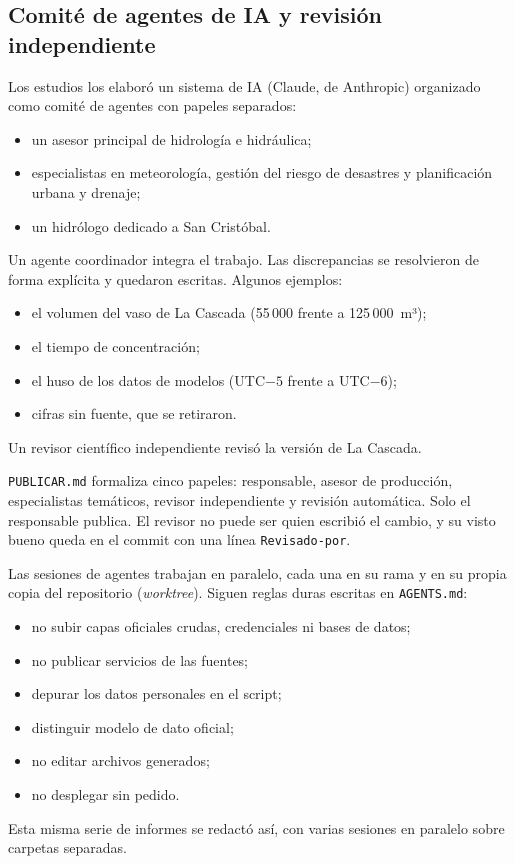 \documentclass{sosg-informe}
\begin{document}
\subsection{Comité de agentes de IA y revisión independiente}
Los estudios los elaboró un sistema de IA (Claude, de Anthropic) organizado como comité de agentes con papeles separados:
\begin{itemize}
  \item un asesor principal de hidrología e hidráulica;
  \item especialistas en meteorología, gestión del riesgo de desastres y planificación urbana y drenaje;
  \item un hidrólogo dedicado a San Cristóbal.
\end{itemize}
Un agente coordinador integra el trabajo. Las discrepancias se resolvieron de forma explícita y quedaron escritas. Algunos ejemplos:
\begin{itemize}
  \item el volumen del vaso de La Cascada (55\,000 frente a 125\,000~m³);
  \item el tiempo de concentración;
  \item el huso de los datos de modelos (UTC$-5$ frente a UTC$-6$);
  \item cifras sin fuente, que se retiraron.
\end{itemize}
Un revisor científico independiente revisó la versión de La Cascada.

\texttt{PUBLICAR.md} formaliza cinco papeles: responsable, asesor de producción, especialistas temáticos, revisor independiente y revisión automática. Solo el responsable publica. El revisor no puede ser quien escribió el cambio, y su visto bueno queda en el commit con una línea \texttt{Revisado-por}.

Las sesiones de agentes trabajan en paralelo, cada una en su rama y en su propia copia del repositorio (\emph{worktree}). Siguen reglas duras escritas en \texttt{AGENTS.md}:
\begin{itemize}
  \item no subir capas oficiales crudas, credenciales ni bases de datos;
  \item no publicar servicios de las fuentes;
  \item depurar los datos personales en el script;
  \item distinguir modelo de dato oficial;
  \item no editar archivos generados;
  \item no desplegar sin pedido.
\end{itemize}
Esta misma serie de informes se redactó así, con varias sesiones en paralelo sobre carpetas separadas.
\end{document}
